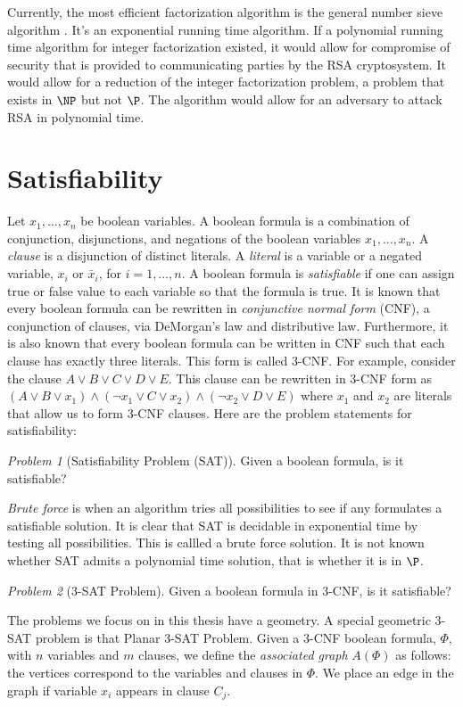 \documentclass[10pt]{CSUNthesis}
\theoremstyle{plain}%
\theoremstyle{definition}
\theoremstyle{remark}
\newtheorem{prob}{Problem}
\begin{document}
Currently, the most efficient factorization algorithm is the general number sieve algorithm \cite{lenstra1993number}.
It's an exponential running time algorithm.
If a polynomial running time algorithm for integer factorization existed, it would allow for compromise of security that is provided to communicating parties by the RSA cryptosystem.
It would allow for a reduction of the integer factorization problem, a problem that exists in $\NP$ but not $\P$.
The algorithm would allow for an adversary to attack RSA \cite{menezes1996handbook} in polynomial time.



\section{Satisfiability}\label{sec:logic}
Let $x_1, \dots, x_n$ be boolean variables.  A boolean formula is a combination of conjunction, 
disjunctions, and negations of the boolean variables $x_1,  \dots, x_n$.   
A \textit{clause} is a disjunction of distinct literals.  
A \textit{literal} is a variable or a negated variable, $x_i$ or $\bar{x}_i$, for $i = 1,\dots,n$. 
A boolean formula is \textit{satisfiable} if one can assign true or false value to each variable so that the formula is true. 
It is known that every boolean formula can be rewritten in \textit{conjunctive normal form} (CNF), a conjunction of clauses, via DeMorgan's law and distributive law.   
Furthermore, it is also known that every boolean formula can be written in CNF such that each clause has exactly three literals. 
This form is called 3-CNF.  
For example, consider the clause $A \lor B \lor C \lor D \lor E$. 
This clause can be rewritten in 3-CNF form as $(A \lor B \lor x_1) \land (\lnot x_1 \lor C \lor x_2) \land (\lnot x_2 \lor D \lor E)$ where $x_1$ and $x_2$ are literals that allow us to form 3-CNF clauses.
Here are the problem statements for satisfiability:
\begin{prob}[Satisfiability Problem (SAT)]\label{prob:Satisfiability-1}%
Given a boolean formula, is it satisfiable? \cite{skiena2009algorithm}
\end{prob} 
\textit{Brute force} is when an algorithm tries all possibilities to see if any formulates a satisfiable solution.
It is clear that SAT is decidable in exponential time by testing all possibilities.
This is callled a brute force solution.
It is not known whether SAT admits a polynomial time solution, that is whether it is in $\P$. 
\begin{prob}[3-SAT Problem]
Given a boolean formula in 3-CNF, is it satisfiable?
\end{prob}
The problems we focus on in this thesis have a geometry.  
A special geometric 3-SAT problem is that Planar 3-SAT Problem.   
Given a 3-CNF boolean formula, $\Phi$, with $n$ variables and $m$ clauses, 
we define the \textit{associated graph} $A(\Phi)$ as follows: the vertices correspond to the variables and clauses in $\Phi$.   
We place an edge in the graph if variable $x_i$ appears in clause $C_j$.
\end{document}
